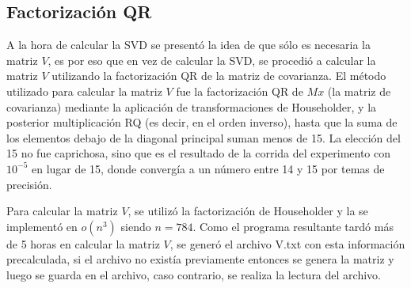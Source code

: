 \subsection{Factorizaci\'on QR}
A la hora de calcular la SVD se present\'o la idea de que s\'olo es necesaria la matriz $V$, es por eso que en vez de calcular la SVD, se procedi\'o a calcular la matriz $V$ utilizando la factorizaci\'on QR de la matriz de covarianza. El m\'etodo utilizado para calcular la matriz $V$ fue la factorizaci\'on QR de $Mx$ (la matriz de covarianza) mediante la aplicaci\'on de transformaciones de Householder, y la posterior multiplicaci\'on RQ (es decir, en el orden inverso), hasta que la suma de los elementos debajo de la diagonal principal suman menos de 15. La elecci\'on del 15 no fue caprichosa, sino que es el resultado de la corrida del experimento con $10^{-5}$ en lugar de 15, donde converg\'ia a un n\'umero entre 14 y 15 por temas de precisi\'on.

Para calcular la matriz $V$, se utiliz\'o la factorizaci\'on de Householder y la se implement\'o en $o(n^3)$ siendo $n = 784$. Como el programa resultante tard\'o m\'as de 5 horas en calcular la matriz $V$, se gener\'o el archivo V.txt con esta informaci\'on precalculada, si el archivo no exist\'ia previamente entonces se genera la matriz y luego se guarda en el archivo, caso contrario, se realiza la lectura del archivo.
